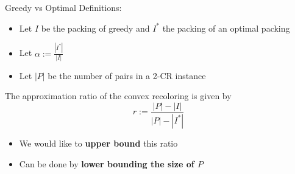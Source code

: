 \begin{frame}{Greedy vs Optimal}
Definitions:
\begin{itemize}
\pause\item
Let $I$ be the packing of greedy and $I^*$ the packing of an optimal packing

\pause\item
Let $\alpha := \frac{|I^*|}{|I|}$ 

\pause\item
Let $|P|$ be the number of pairs in a 2-CR instance

\end{itemize}

\pause
The approximation ratio of the convex recoloring is given by
$$ r := \frac{|P| - |I|}{|P| - |I^*|} $$

\begin{itemize}
\pause\item
We would like to \textbf{upper bound} this ratio
\pause\item
Can be done by \textbf{lower bounding the size of $P$}
\end{itemize}


\end{frame}